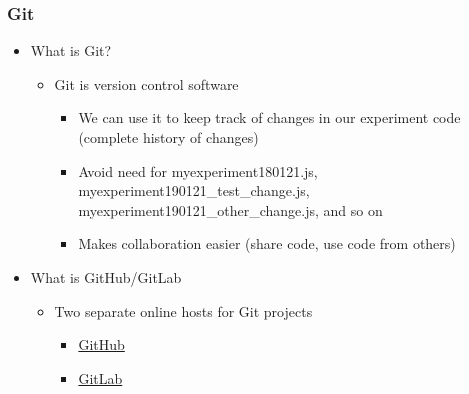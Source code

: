 \documentclass[t]{beamer}
\begin{document}
\begin{frame}[fragile]
    \frametitle{Git}
    \begin{itemize}
        \item What is Git?
            \begin{itemize}
                \item Git is version control software
                    \begin{itemize}
                        \item We can use it to keep track of changes in our experiment code (complete history of changes)
                        \item Avoid need for myexperiment180121.js, myexperiment190121\_test\_change.js, myexperiment190121\_other\_change.js, and so on
                        \item Makes collaboration easier (share code, use code from others)
                    \end{itemize}
            \end{itemize}
        \item What is GitHub/GitLab
            \begin{itemize}
                \item Two separate online hosts for Git projects
                    \begin{itemize}
                        \item \href{https://github.com/}{GitHub}
                        \item \href{https://gitlab.com/}{GitLab}
                    \end{itemize}
            \end{itemize}
    \end{itemize}
\end{frame}
\end{document}

